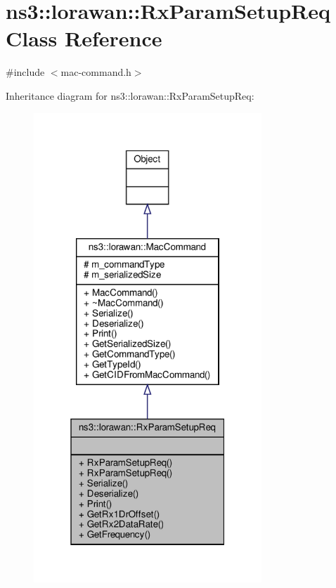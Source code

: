 \hypertarget{classns3_1_1lorawan_1_1RxParamSetupReq}{}\section{ns3\+:\+:lorawan\+:\+:Rx\+Param\+Setup\+Req Class Reference}
\label{classns3_1_1lorawan_1_1RxParamSetupReq}


{\ttfamily \#include $<$mac-\/command.\+h$>$}



Inheritance diagram for ns3\+:\+:lorawan\+:\+:Rx\+Param\+Setup\+Req\+:
\nopagebreak
\begin{figure}[H]
\begin{center}
\leavevmode
\includegraphics[width=243pt]{classns3_1_1lorawan_1_1RxParamSetupReq__inherit__graph}
\end{center}
\end{figure}


